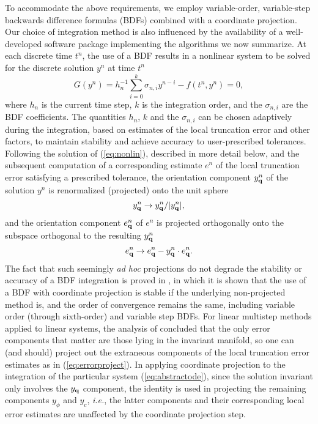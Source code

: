 To accommodate the above requirements, we employ variable-order,
variable-step backwards difference formulas (BDFs) combined with a
coordinate projection.  Our choice of integration method is also
influenced by the availability of a well-developed software package
implementing the algorithms we now summarize.  At each discrete time
$t^n$, the use of a BDF results in a nonlinear system to be solved for
the discrete solution $y^n$ at time $t^n$
%
\begin{equation}
  G(y^n) = h_n^{-1} \sum_{i=0}^k \sigma_{n,i} y^{n-i} - f(t^n,y^n) = 0,
\label{eq:nonlin}
\end{equation}
%
where $h_n$ is the current time step, $k$ is the integration order, and
the $\sigma_{n,i}$ are the BDF coefficients.  The quantities $h_n$,
$k$ and the $\sigma_{n,i}$ can be chosen adaptively during the
integration, based on estimates of the local truncation error and
other factors, to maintain stability and achieve accuracy to
user-prescribed tolerances.  Following the solution of
(\ref{eq:nonlin}), described in more detail below, and the subsequent
computation of a corresponding estimate $e^n$ of the local truncation
error satisfying a prescribed tolerance, the orientation component
$y_{\bf q}^n$ of the solution $y^n$ is renormalized (projected) onto
the unit sphere
%
\begin{equation}
  y_{\bf q}^n \rightarrow y_{\bf q}^n / |y_{\bf q}^n|,
\end{equation}
%
and the orientation component $e_{\bf q}^n$ of $e^n$ is projected
orthogonally onto the subspace orthogonal to the resulting $y_{\bf q}^n$
%
\begin{equation}
  e_{\bf q}^n \rightarrow e_{\bf q}^n - y_{\bf q}^n \cdot e_{\bf q}^n.
\label{eq:errorproject}
\end{equation}
%
The fact that such seemingly {\em ad hoc} projections do not degrade
the stability or accuracy of a BDF integration is proved in
\cite{Eich1993}, in which it is shown that the use of a BDF with
coordinate projection is stable if the underlying non-projected method
is, and the order of convergence remains the same, including variable
order (through sixth-order) and variable step BDFs.  For linear
multistep methods applied to linear systems, the analysis of
\cite{Eich1993} concluded that the only error components that matter are
those lying in the invariant manifold, so one can (and should) project
out the extraneous components of the local truncation error estimates
as in (\ref{eq:errorproject}).  In applying coordinate projection to
the integration of the particular system (\ref{eq:abstractode}), since
the solution invariant only involves the $y_{\bf q}$ component, the
identity is used in projecting the remaining components $y_{\phi}$ and
$y_c$, {\em i.e.}, the latter components and their corresponding local
error estimates are unaffected by the coordinate projection step.

